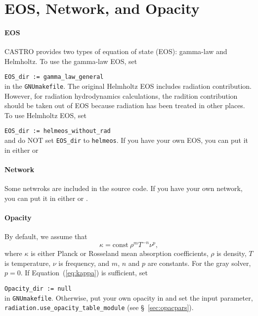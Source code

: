 \documentclass[11pt,letterpaper]{article}
\begin{document}
\section{EOS, Network, and Opacity}

\paragraph{EOS} CASTRO provides two types of equation of state (EOS):
gamma-law and Helmholtz.  To use the gamma-law EOS, set 
\vspace{5pt}

\verb|EOS_dir := gamma_law_general|\\[5pt]
in the {\tt GNUmakefile}.  The original Helmholtz EOS includes
radiation contribution.  However, for radiation hydrodynamics
calculations, the radition contribution should be taken out of EOS
because radiation has been treated in other places.  To use Helmholtz
EOS, set \vspace{5pt}

\verb|EOS_dir := helmeos_without_rad|\\[5pt]
and do NOT set \verb|EOS_dir| to {\tt helmeos}.  If you have your own
EOS, you can put it in either {\tt{}} or
{\tt{}}

\paragraph{Network} Some netwroks are included in the source code.  If
you have your own network, you can put it in either
{\tt{}} or
{\tt{}}.

\paragraph{Opacity} By default, we assume that
\begin{equation}
  \kappa = \mathrm{const}\ \rho^{m} T^{-n} \nu^{p} , \label{eq:kappa}
\end{equation}
where $\kappa$ is either Planck or Rosseland mean absorption
coefficients, $\rho$ is density, $T$ is temperature, $\nu$ is
frequency, and $m$, $n$ and $p$ are constants.  For the gray solver,
$p = 0$.  If Equation~(\ref{eq:kappa}) is sufficient, set \vspace{5pt}

\verb|Opacity_dir := null|\\[5pt]
in {\tt GNUmakefile}.  Otherwise, put your own opacity in
{\tt{}} and set
the input parameter, {\tt radiation.use\_opacity\_table\_module} (see
\S~\ref{sec:opacpars}). 
\end{document}
